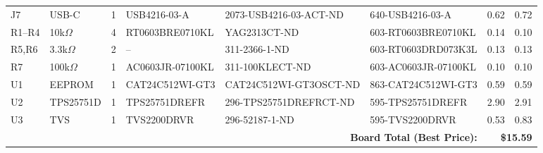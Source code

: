 {\begin{longtable}{@{}llrlp{2.8cm}p{2.5cm}rr@{}}
J7 & USB-C & 1 & USB4216-03-A & 2073-USB4216-03-ACT-ND & 640-USB4216-03-A & 0.62 & 0.72 \\
R1--R4 & 10k$\Omega$ & 4 & RT0603BRE0710KL & YAG2313CT-ND & 603-RT0603BRE0710KL & 0.14 & 0.10 \\
R5,R6 & 3.3k$\Omega$ & 2 & -- & 311-2366-1-ND & 603-RT0603DRD073K3L & 0.13 & 0.13 \\
R7 & 100k$\Omega$ & 1 & AC0603JR-07100KL & 311-100KLECT-ND & 603-AC0603JR-07100KL & 0.10 & 0.10 \\
U1 & EEPROM & 1 & CAT24C512WI-GT3 & CAT24C512WI-GT3OSCT-ND & 863-CAT24C512WI-GT3 & 0.59 & 0.59 \\
U2 & TPS25751D & 1 & TPS25751DREFR & 296-TPS25751DREFRCT-ND & 595-TPS25751DREFR & 2.90 & 2.91 \\
U3 & TVS & 1 & TVS2200DRVR & 296-52187-1-ND & 595-TVS2200DRVR & 0.53 & 0.83 \\
\midrule
\multicolumn{6}{r}{\textbf{Board Total (Best Price):}} & \multicolumn{2}{r}{\textbf{\$15.59}} \\
\end{longtable}

}
